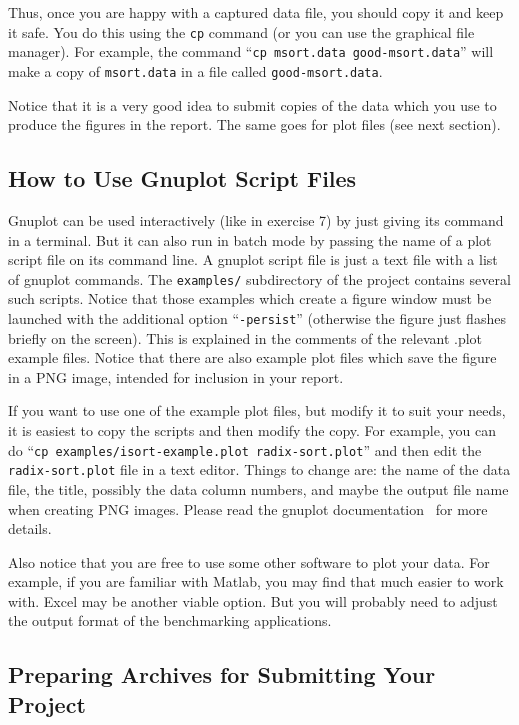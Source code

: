 \documentclass[a4paper,10pt]{article}
\begin{document}
Thus, once you are happy with a captured data file, you should copy it and keep it safe.
You do this using the \texttt{cp} command (or you can use the graphical file manager).
For example, the command ``\texttt{cp msort.data good-msort.data}'' will make a copy of \texttt{msort.data} in a file called \texttt{good-msort.data}.

Notice that it is a very good idea to submit copies of the data which you use to produce the figures in the report.
The same goes for plot files (see next section).



\subsection*{How to Use Gnuplot Script Files}

Gnuplot can be used interactively (like in exercise 7) by just giving its command in a terminal.
But it can also run in batch mode by passing the name of a plot script file on its command line.
A gnuplot script file is just a text file with a list of gnuplot commands.
The \texttt{examples/} subdirectory of the project contains several such scripts.
Notice that those examples which create a figure window must be launched with the additional option ``\texttt{-persist}'' (otherwise the figure just flashes briefly on the screen).
This is explained in the comments of the relevant .plot example files.
Notice that there are also example plot files which save the figure in a PNG image, intended for inclusion in your report.

If you want to use one of the example plot files, but modify it to suit your needs, it is easiest to copy the scripts and then modify the copy.
For example, you can do ``\texttt{cp examples/isort-example.plot radix-sort.plot}'' and then edit the \texttt{radix-sort.plot} file in a text editor.
Things to change are: the name of the data file, the title, possibly the data column numbers, and maybe the output file name when creating PNG images.
Please read the gnuplot documentation~\cite{gnuplot} for more details.

Also notice that you are free to use some other software to plot your data.
For example, if you are familiar with Matlab, you may find that much easier to work with.
Excel may be another viable option.
But you will probably need to adjust the output format of the benchmarking applications.



\subsection*{Preparing Archives for Submitting Your Project}
\end{document}
